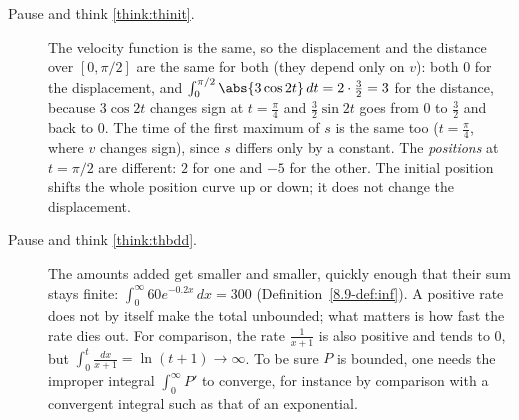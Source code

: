 \documentclass[11pt]{article}
\begin{document}
\begin{description}
  \item[Pause and think \ref{think:thinit}.] The velocity function is the same, so the displacement and the distance over $[0,\pi/2]$ are the same for both (they depend only on $v$): both $0$ for the displacement, and $\int_0^{\pi/2}\abs{3\cos2t}\,dt=2\cdot\frac32=3$ for the distance, because $3\cos2t$ changes sign at $t=\frac\pi4$ and $\frac32\sin2t$ goes from $0$ to $\frac32$ and back to $0$. The time of the first maximum of $s$ is the same too ($t=\frac\pi4$, where $v$ changes sign), since $s$ differs only by a constant. The \emph{positions} at $t=\pi/2$ are different: $2$ for one and $-5$ for the other. The initial position shifts the whole position curve up or down; it does not change the displacement.

  \item[Pause and think \ref{think:thbdd}.] The amounts added get smaller and smaller, quickly enough that their sum stays finite: $\int_0^\infty60e^{-0.2x}\,dx=300$ (Definition~\ref{8.9-def:inf}). A positive rate does not by itself make the total unbounded; what matters is how fast the rate dies out. For comparison, the rate $\frac1{x+1}$ is also positive and tends to $0$, but $\int_0^t\frac{dx}{x+1}=\ln(t+1)\to\infty$. To be sure $P$ is bounded, one needs the improper integral $\int_0^\infty P'$ to converge, for instance by comparison with a convergent integral such as that of an exponential.

\end{description}
\end{document}
